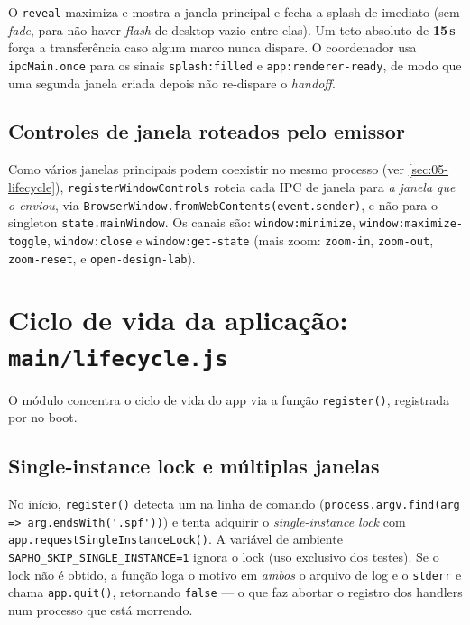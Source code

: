O \lstinline|reveal| maximiza e mostra a janela principal e fecha a splash de
imediato (sem \emph{fade}, para não haver \emph{flash} de desktop vazio entre
elas). Um teto absoluto de \textbf{15\,s} força a transferência caso algum marco
nunca dispare. O coordenador usa \lstinline|ipcMain.once| para os sinais
\lstinline|splash:filled| e \lstinline|app:renderer-ready|, de modo que uma
segunda janela criada depois não re-dispare o \emph{handoff}.

\subsection{Controles de janela roteados pelo emissor}
\label{sec:05-window-controls}

Como vários janelas principais podem coexistir no mesmo processo (ver
\autoref{sec:05-lifecycle}), \lstinline|registerWindowControls| roteia cada IPC
de janela para \emph{a janela que o enviou}, via
\lstinline|BrowserWindow.fromWebContents(event.sender)|, e não para o singleton
\lstinline|state.mainWindow|. Os canais são: \lstinline|window:minimize|,
\lstinline|window:maximize-toggle|, \lstinline|window:close| e
\lstinline|window:get-state| (mais zoom: \lstinline|zoom-in|,
\lstinline|zoom-out|, \lstinline|zoom-reset|, e \lstinline|open-design-lab|).

\section{Ciclo de vida da aplicação: \texttt{main/lifecycle.js}}
\label{sec:05-lifecycle}

O módulo  concentra o ciclo de vida do app via a função
\lstinline|register()|, registrada por  no boot.

\subsection{Single-instance lock e múltiplas janelas}

No início, \lstinline|register()| detecta um  na linha de comando
(\lstinline|process.argv.find(arg => arg.endsWith('.spf'))|) e tenta adquirir o
\emph{single-instance lock} com \lstinline|app.requestSingleInstanceLock()|. A
variável de ambiente \lstinline|SAPHO_SKIP_SINGLE_INSTANCE=1| ignora o lock (uso
exclusivo dos testes). Se o lock não é obtido, a função loga o motivo em
\emph{ambos} o arquivo de log e o \lstinline|stderr| e chama
\lstinline|app.quit()|, retornando \lstinline|false| --- o que faz 
abortar o registro dos handlers num processo que está morrendo.

